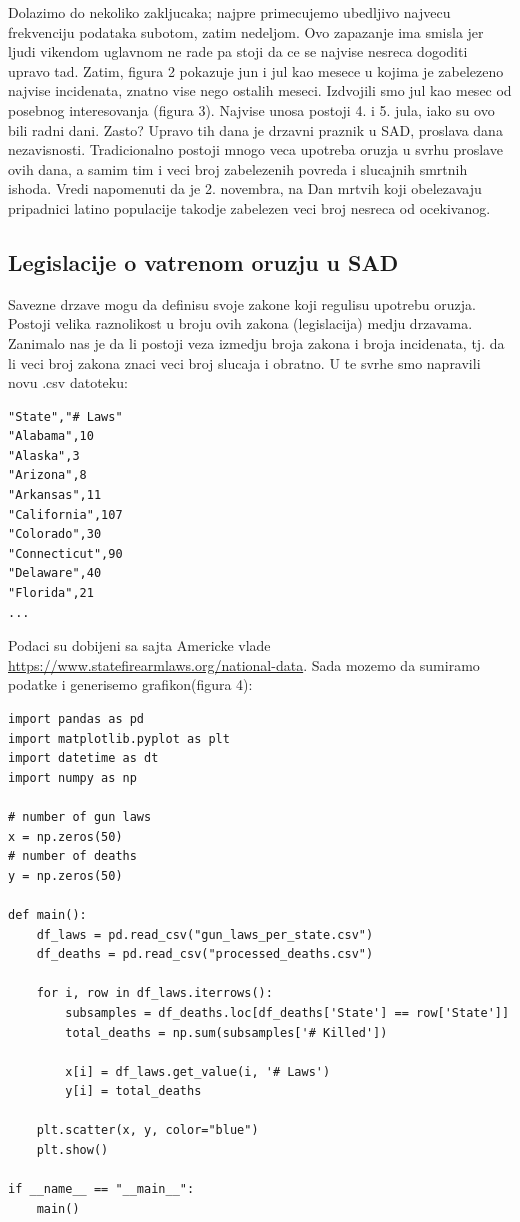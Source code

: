 \documentclass[11pt]{article} %
\begin{document}
Dolazimo do nekoliko zakljucaka; najpre primecujemo ubedljivo najvecu frekvenciju podataka subotom, zatim nedeljom. 
Ovo zapazanje ima smisla jer ljudi vikendom uglavnom ne rade pa stoji da ce se najvise nesreca dogoditi upravo tad.
Zatim, figura 2 pokazuje jun i jul kao mesece u kojima je zabelezeno najvise incidenata, znatno vise nego ostalih 
meseci. Izdvojili smo jul kao mesec od posebnog interesovanja (figura 3). Najvise unosa postoji 4. i 5. jula, iako 
su ovo bili radni dani. Zasto? Upravo tih dana je drzavni praznik u SAD, proslava dana nezavisnosti. Tradicionalno
postoji mnogo veca upotreba oruzja u svrhu proslave ovih dana, a samim tim i veci broj zabelezenih povreda i slucajnih 
smrtnih ishoda. Vredi napomenuti da je 2. novembra, na Dan mrtvih koji obelezavaju pripadnici latino populacije takodje
zabelezen veci broj nesreca od ocekivanog.
\subsection{Legislacije o vatrenom oruzju u SAD}
Savezne drzave mogu da definisu svoje zakone koji regulisu upotrebu oruzja. Postoji velika raznolikost u broju ovih zakona (legislacija)
medju drzavama. Zanimalo nas je da li postoji veza izmedju broja zakona i broja incidenata, tj. da li veci broj zakona znaci veci broj slucaja 
i obratno. U te svrhe smo napravili novu .csv datoteku:\newline\newline\newline\newline\newline
\begin{lstlisting}[caption={gun\_laws\_per\_state.csv}]
"State","# Laws"
"Alabama",10
"Alaska",3
"Arizona",8
"Arkansas",11
"California",107
"Colorado",30
"Connecticut",90
"Delaware",40
"Florida",21
...
\end{lstlisting}
Podaci su dobijeni sa sajta Americke vlade \url{https://www.statefirearmlaws.org/national-data}. Sada mozemo da sumiramo
podatke i generisemo grafikon(figura 4):
\begin{lstlisting}[caption={processing\_gun\_laws.py}]
import pandas as pd
import matplotlib.pyplot as plt
import datetime as dt
import numpy as np

# number of gun laws
x = np.zeros(50)
# number of deaths
y = np.zeros(50)

def main():
	df_laws = pd.read_csv("gun_laws_per_state.csv")
	df_deaths = pd.read_csv("processed_deaths.csv")

	for i, row in df_laws.iterrows():
		subsamples = df_deaths.loc[df_deaths['State'] == row['State']]
		total_deaths = np.sum(subsamples['# Killed'])

		x[i] = df_laws.get_value(i, '# Laws')
		y[i] = total_deaths

	plt.scatter(x, y, color="blue")
	plt.show()

if __name__ == "__main__":
	main()
\end{lstlisting}
\end{document}
